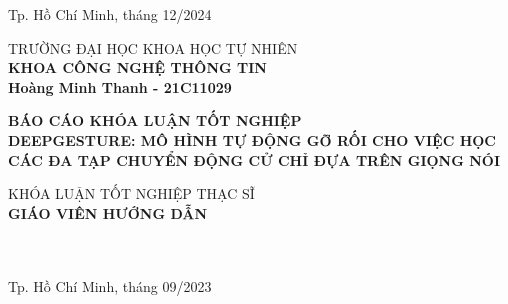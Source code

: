 \begin{titlepage}
\begin{center}

\vfill
Tp. Hồ Chí Minh, tháng 12/2024

\end{center}

\pagebreak



\begin{center}

TRƯỜNG ĐẠI HỌC KHOA HỌC TỰ NHIÊN\\
\textbf{KHOA CÔNG NGHỆ THÔNG TIN}\\[2cm]


{\large \bfseries Hoàng Minh Thanh - 21C11029\\[2cm]}


{ \Large \bfseries  BÁO CÁO KHÓA LUẬN TỐT NGHIỆP \\
	DEEPGESTURE: MÔ HÌNH TỰ ĐỘNG GỠ RỐI CHO VIỆC HỌC CÁC ĐA TẠP CHUYỂN ĐỘNG CỬ CHỈ ĐỰA TRÊN GIỌNG NÓI \\[2cm] } 
	

\large KHÓA LUẬN TỐT NGHIỆP THẠC SĨ \\


\textbf{GIÁO VIÊN HƯỚNG DẪN}\\
\tenGVHD\\
\tenBM\\


\vfill
Tp. Hồ Chí Minh, tháng 09/2023

\end{center}

\end{titlepage}